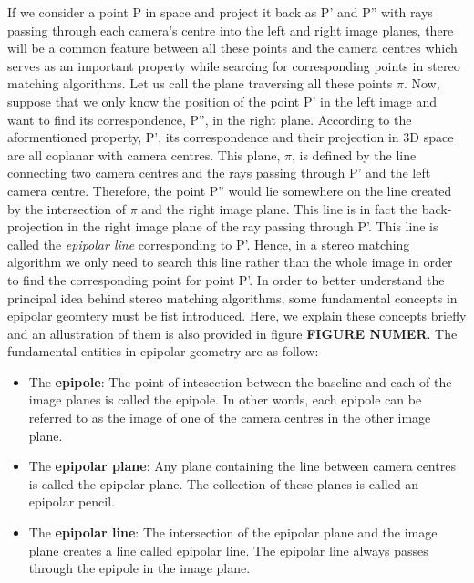 \documentclass[dvips,letterpaper,12pt]{report}
\begin{document}
If we consider a point P in space and project it back as P' and P'' with rays passing through each camera's centre
into the left and right image planes, there will be a common feature between all these points and the camera centres which serves as an important property while searcing for corresponding points
in stereo matching algorithms. Let us call the plane traversing all these points $\pi$.
Now, suppose that we only know the position of the point P' in the left image and want to find its correspondence, P'', in the right plane. According to the aformentioned property, P',
its correspondence and their projection in 3D space are all coplanar with camera centres. This plane, $\pi$, is defined by the line connecting two camera centres and 
the rays passing through P' and the left camera centre. Therefore, the point P'' would lie somewhere on the line created by the intersection of $\pi$ and the right image plane.
This line is in fact the back-projection in the right image plane of the ray passing through P'. This line is called the {\it epipolar line} corresponding to P'. Hence, in a stereo matching algorithm
we only need to search this line rather than the whole image in order to find the corresponding point for point P'.
In order to better understand the principal idea behind stereo matching algorithms, some fundamental concepts in epipolar geomtery must be fist introduced. 
Here, we explain these concepts briefly and an allustration of them is also provided in figure \textbf{FIGURE NUMER}.
\newline
The fundamental entities in epipolar geometry are as follow: \cite{hart2000}
\begin{itemize}
\item The \textbf{epipole}: The point of intesection between the baseline and each of the image planes is called the epipole. In other words, each epipole can be referred to as the image of one of
the camera centres in the other image plane.

\item The \textbf{epipolar plane}: Any plane containing the line between camera centres is called the epipolar plane. The collection of these planes is called an epipolar pencil. 

\item The \textbf{epipolar line}: The intersection of the epipolar plane and the image plane creates a line called epipolar line. The epipolar line always passes through the epipole in the 
image plane.
\end{itemize}
\end{document}

